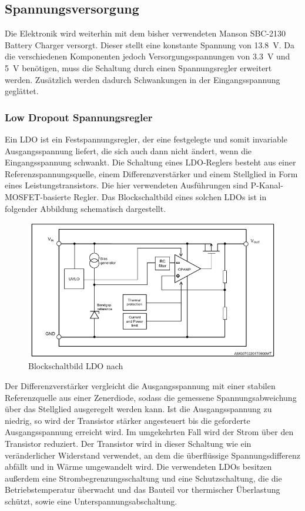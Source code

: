 \subsection{Spannungsversorgung}\label{sec:spannver}
Die Elektronik wird weiterhin mit dem bisher verwendeten Manson SBC-2130 Battery Charger versorgt. Dieser stellt eine konstante Spannung von \SI{13,8}{V}. Da die verschiedenen Komponenten jedoch Versorgungsspannungen von \SI{3,3}{V} und \SI{5}{V} benötigen, muss die Schaltung durch einen Spannungsregler erweitert werden. Zusätzlich werden dadurch Schwankungen in der Eingangsspannung geglättet. 

\subsubsection{Low Dropout Spannungsregler}
Ein LDO ist ein Festspannungsregler, der eine festgelegte und somit invariable Ausgangsspannung liefert, die sich auch dann nicht ändert, wenn die Eingangsspannung schwankt. Die Schaltung eines LDO-Reglers besteht aus einer Referenzspannungsquelle, einem Differenzverstärker und einem Stellglied in Form eines Leistungstransistors. Die hier verwendeten Ausführungen sind P-Kanal-MOSFET-basierte Regler. Das Blockschaltbild eines solchen LDOs ist in folgender Abbildung schematisch dargestellt.\\
\begin{figure}[H]
	\centering
		\includegraphics[width=350pt]{./Bilder/LDO.png}
	\caption{Blockschaltbild LDO nach \cite{ldo}}
	\label{fig:LDO2}
\end{figure} \noindent
Der Differenzverstärker vergleicht die Ausgangsspannung mit einer stabilen Referenzquelle aus einer Zenerdiode, sodass die gemessene Spannungsabweichung über das Stellglied ausgeregelt werden kann. Ist die Ausgangsspannung zu niedrig, so wird der Transistor stärker angesteuert bis die geforderte Ausgangsspannung erreicht wird. Im umgekehrten Fall wird der Strom über den Transistor reduziert. Der Transistor wird in dieser Schaltung wie ein veränderlicher Widerstand verwendet, an dem die überflüssige Spannungsdifferenz abfällt und in Wärme umgewandelt wird. Die verwendeten LDOs besitzen außerdem eine Strombegrenzungsschaltung und eine Schutzschaltung, die die Betriebstemperatur überwacht und das Bauteil vor thermischer Überlastung schützt, sowie eine Unterspannungsabschaltung. 

